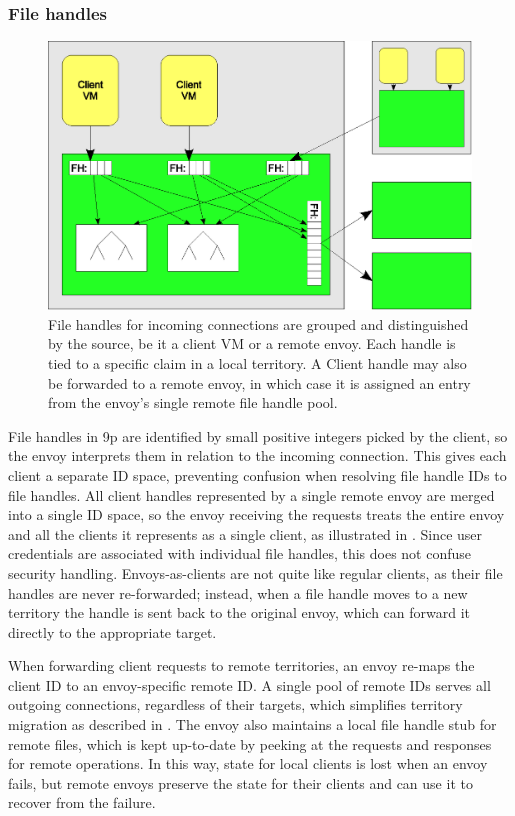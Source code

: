 \subsubsection{File handles}

\begin{figure}[t]
\centering
\includegraphics[width=\figwidth]{figures/file-handles}
\caption[Managing file handles in local and remote envoys]{File handles for incoming connections are grouped and distinguished by the source, be it a client VM or a remote envoy. Each handle is tied to a specific claim in a local territory. A Client handle may also be forwarded to a remote envoy, in which case it is assigned an entry from the envoy's single remote file handle pool.}
\label{fig:file-handles}
\end{figure}

File handles in 9p are identified by small positive integers picked by the client, so the envoy interprets them in relation to the incoming connection. This gives each client a separate ID space, preventing confusion when resolving file handle IDs to file handles. All client handles represented by a single remote envoy are merged into a single ID space, so the envoy receiving the requests treats the entire envoy and all the clients it represents as a single client, as illustrated in . Since user credentials are associated with individual file handles, this does not confuse security handling. Envoys-as-clients are not quite like regular clients, as their file handles are never re-forwarded; instead, when a file handle moves to a new territory the handle is sent back to the original envoy, which can forward it directly to the appropriate target.

When forwarding client requests to remote territories, an envoy re-maps the client ID to an envoy-specific remote ID. A single pool of remote IDs serves all outgoing connections, regardless of their targets, which simplifies territory migration as described in . The envoy also maintains a local file handle stub for remote files, which is kept up-to-date by peeking at the requests and responses for remote operations. In this way, state for local clients is lost when an envoy fails, but remote envoys preserve the state for their clients and can use it to recover from the failure.

